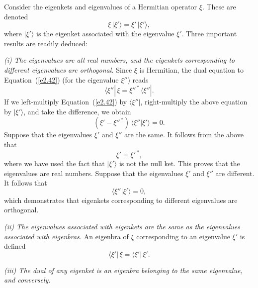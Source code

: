 Consider the eigenkets and eigenvalues of a Hermitian operator $\xi$. These are
denoted
\begin{equation}\label{e2.42}
\xi\, |\xi'\rangle = \xi' \,|\xi' \rangle,
\end{equation}
where $|\xi'\rangle$ is the eigenket associated with the eigenvalue $\xi'$.
Three important results are readily deduced:

{\em (i) The eigenvalues are all real numbers, and the eigenkets corresponding
to different eigenvalues are orthogonal.}
Since $\xi$ is Hermitian, the dual equation to Equation~(\ref{e2.42}) (for the eigenvalue
$\xi''$) reads
\begin{equation}
\langle \xi''|\,\xi = \xi''^{\,\ast}\, \langle \xi''|.
\end{equation}
If we left-multiply Equation~(\ref{e2.42}) by $\langle \xi''|$, right-multiply the above
equation by $|\xi'\rangle$, and take the difference, we obtain
\begin{equation}
(\xi' - \xi''^{\,\ast})\, \langle \xi''|\xi'\rangle = 0.
\end{equation}
Suppose that the eigenvalues $\xi'$ and $\xi''$ are the same. It follows from the
above that
\begin{equation}
\xi' = \xi'^{\,\ast},
\end{equation}
where we have used the fact that $|\xi'\rangle$ is not the null ket. This proves
that the eigenvalues are real numbers. Suppose that the eigenvalues
$\xi'$ and $\xi''$ are different. It follows that
\begin{equation}
\langle \xi''|\xi'\rangle = 0,
\end{equation}
which demonstrates that eigenkets corresponding to different eigenvalues are
 orthogonal.

{\em (ii) The eigenvalues associated with eigenkets are the same as the eigenvalues
associated with eigenbras.} An eigenbra of $\xi$ corresponding to an eigenvalue
$\xi'$ is defined
\begin{equation}
\langle \xi'|\,\xi = \langle \xi'|\,\xi'.
\end{equation}

{\em (iii) The dual of any eigenket is an eigenbra belonging to the same eigenvalue,
and conversely.}

